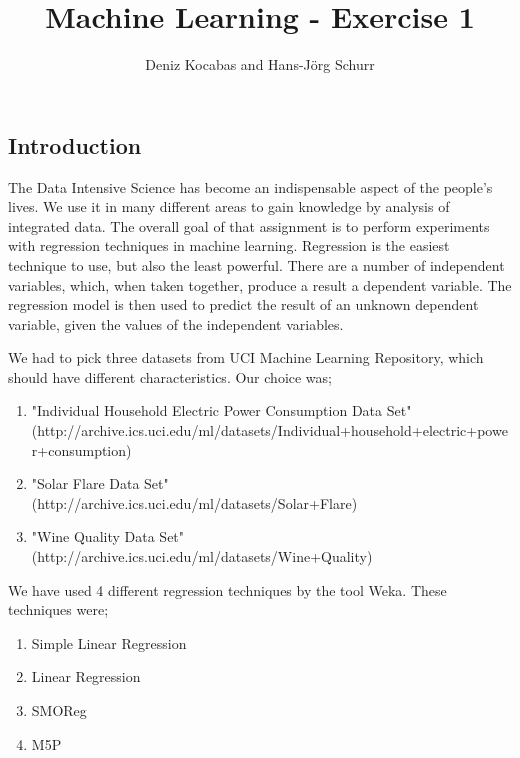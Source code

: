 \documentclass[a4paper]{article}
\begin{document}
\title{Machine Learning - Exercise 1 }
\author{Deniz Kocabas and Hans-Jörg Schurr}

\maketitle
\tableofcontents
\newpage

\subsection{Introduction}
The Data Intensive Science has become an indispensable aspect of the people's lives. We use it in many different areas to gain knowledge by analysis of integrated data. The overall goal of that assignment is to perform experiments with regression techniques in machine learning. Regression is the easiest technique to use, but also the least powerful. There are a number of independent variables, which, when taken together, produce a result a dependent variable. The regression model is then used to predict the result of an unknown dependent variable, given the values of the independent variables. 

We had to pick three datasets from UCI Machine Learning Repository, which should have different characteristics. 
Our choice was;
\begin{enumerate}
    \item "Individual Household Electric Power Consumption Data Set" \\ (http://archive.ics.uci.edu/ml/datasets/Individual+household+electric+power+consumption)
    \item "Solar Flare Data Set" \\
        (http://archive.ics.uci.edu/ml/datasets/Solar+Flare)
    \item "Wine Quality Data Set" \\
        (http://archive.ics.uci.edu/ml/datasets/Wine+Quality)
\end{enumerate}

We have used 4 different regression techniques by the tool Weka. 
These techniques were;
\begin{enumerate}
    \item Simple Linear Regression
    \item Linear Regression
    \item SMOReg
    \item M5P
\end{enumerate}
\end{document}
